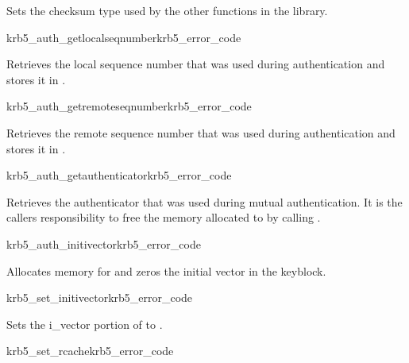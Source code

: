 Sets the checksum type used by the other functions in the library. 

\begin{funcdecl}{krb5_auth_getlocalseqnumber}{krb5_error_code}{\funcinout}
\funcin
{}
\end{funcdecl}

Retrieves the local sequence number that was used during authentication
and stores it in .

\begin{funcdecl}{krb5_auth_getremoteseqnumber}{krb5_error_code}{\funcinout}
\funcin
{}
\end{funcdecl}

Retrieves the remote sequence number that was used during authentication
and stores it in .

\begin{funcdecl}{krb5_auth_getauthenticator}{krb5_error_code}{\funcinout}
\funcout
{}
\end{funcdecl}

Retrieves the authenticator that was used during mutual
authentication. It is the callers responsibility to free the memory
allocated to  by calling
. 

\begin{funcdecl}{krb5_auth_initivector}{krb5_error_code}{\funcinout}
\end{funcdecl}

Allocates memory for and zeros the initial vector in the
 keyblock.

\begin{funcdecl}{krb5_set_initivector}{krb5_error_code}{\funcinout}
\funcin
{}
\end{funcdecl}

Sets the i_vector portion of  to
. 

\begin{funcdecl}{krb5_set_rcache}{krb5_error_code}{\funcinout}
\funcin
{}
\end{funcdecl}

